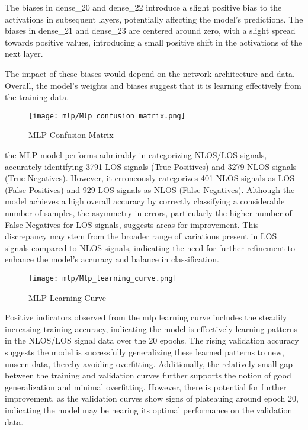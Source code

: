 The biases in dense_20 and dense_22 introduce a slight positive bias to the activations in subsequent layers, potentially affecting the model’s predictions. The biases in dense_21 and dense_23 are centered around zero, with a slight spread towards positive values, introducing a small positive shift in the activations of the next layer.

The impact of these biases would depend on the network architecture and data. Overall, the model’s weights and biases suggest that it is learning effectively from the training data.

\begin{figure}[H] 
  \centering
  \texttt{[image: mlp/Mlp\_confusion\_matrix.png]}
  \caption{MLP Confusion Matrix}\label{fig:mpl_confusion_matrix}
\end{figure}

the MLP model performs admirably in categorizing NLOS/LOS signals, accurately identifying 3791 LOS signals (True Positives) and 3279 NLOS signals (True Negatives). However, it erroneously categorizes 401 NLOS signals as LOS (False Positives) and 929 LOS signals as NLOS (False Negatives). Although the model achieves a high overall accuracy by correctly classifying a considerable number of samples, the asymmetry in errors, particularly the higher number of False Negatives for LOS signals, suggests areas for improvement. This discrepancy may stem from the broader range of variations present in LOS signals compared to NLOS signals, indicating the need for further refinement to enhance the model's accuracy and balance in classification.

\begin{figure}[H] 
  \centering
  \texttt{[image: mlp/Mlp\_learning\_curve.png]}
  \caption{MLP Learning Curve}\label{fig:mlp_learning_curve}
\end{figure}

Positive indicators observed from the mlp learning curve includes the steadily increasing training accuracy, indicating the model is effectively learning patterns in the NLOS/LOS signal data over the 20 epochs. The rising validation accuracy suggests the model is successfully generalizing these learned patterns to new, unseen data, thereby avoiding overfitting. Additionally, the relatively small gap between the training and validation curves further supports the notion of good generalization and minimal overfitting. However, there is potential for further improvement, as the validation curves show signs of plateauing around epoch 20, indicating the model may be nearing its optimal performance on the validation data.

